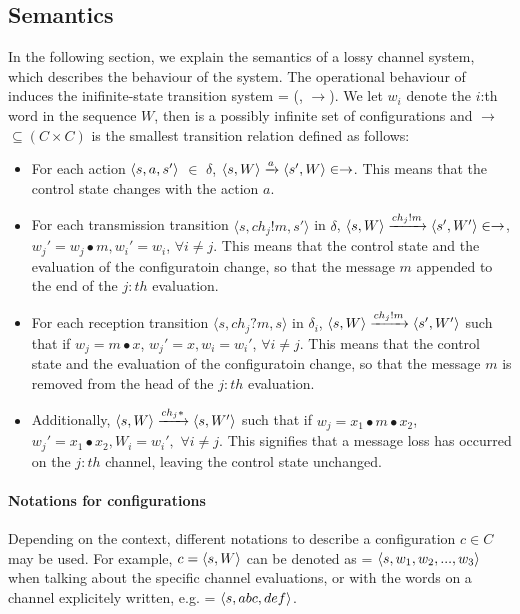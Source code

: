 \subsection{Semantics}
\label{LTS}
In the following section, we explain the semantics of a lossy channel system, which describes the behaviour of the system. The operational behaviour of  induces the inifinite-state transition system  = (, $\rightarrow$). We let $w_i$ denote the $i$:th word in the sequence $W$, then  is a possibly infinite set of configurations and $\rightarrow$ $\subseteq (C \times C)$  is the smallest transition relation defined as follows:
  \begin{itemize}
    \item For each action $\langle s, a, s'\rangle$ $\in$ $\delta$, $\langle s, W\rangle \xrightarrow{a} \langle s', W\rangle \in \rightarrow$. This means that the control state changes with the action $a$.
    \item For each transmission transition $\langle s, ch_j!m, s' \rangle$ in $\delta$, $\langle s, W\rangle \xrightarrow{ch_j!m} \langle s', W'\rangle \in \rightarrow$, $w_j' = w_j\bullet m, w_i' = w_i$, $\forall i \neq j$. This means that the control state and the evaluation of the configuratoin change, so that the message $m$ appended to the end of the $j:th$ evaluation.
    \item For each reception transition $\langle s, ch_j?m, s \rangle$ in $\delta_i$, $\langle s, W\rangle \xrightarrow{ch_j!m} \langle s', W'\rangle$ such that if $w_j = m\bullet x$, $w_j' = x, w_i = w_i'$, $\forall i \neq j$. This means that the control state and the evaluation of the configuratoin change, so that the message $m$ is removed from the head of the $j:th$ evaluation.
    \item Additionally, $\langle s, W\rangle \xrightarrow{ch_j*} \langle s, W'\rangle$ such that if $w_j = x_1\bullet m \bullet x_2$, $w_j' = x_1\bullet x_2, W_i = w_i',$ $\forall i \neq j$. This signifies that a message loss has occurred on the $j:th$ channel, leaving the control state unchanged.
  \end{itemize}

\paragraph{Notations for configurations}
Depending on the context, different notations to describe a configuration $c\in C$ may be used. For example, $c = \langle s, W\rangle$ can be denoted as  = $\langle s, w_1, w_2, ..., w_3\rangle$ when talking about the specific channel evaluations, or with the words on a channel explicitely written, e.g.  = $\langle s, abc, def\rangle$.

